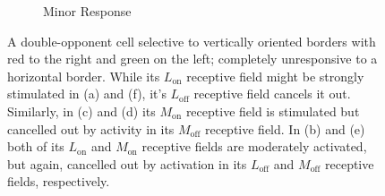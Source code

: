 \documentclass{article}
\begin{document}
\begin{figure}[h]
\begin{subfigure}{0.3\textwidth}
        \caption{Minor Response}
    \end{subfigure}
    \caption{A double-opponent cell selective to vertically oriented borders with red to the right and green on the left; completely unresponsive to a horizontal border. While its $L_{\text{on}}$ receptive field might be strongly stimulated in (a) and (f), it's $L_{\text{off}}$ receptive field cancels it out. Similarly, in (c) and (d) its $M_{\text{on}}$ receptive field is stimulated but cancelled out by activity in its $M_{\text{off}}$ receptive field. In (b) and (e) both of its $L_{\text{on}}$ and $M_{\text{on}}$ receptive fields are moderately activated, but again, cancelled out by activation in its $L_{\text{off}}$ and $M_{\text{off}}$ receptive fields, respectively.}
\end{figure}
\end{document}
